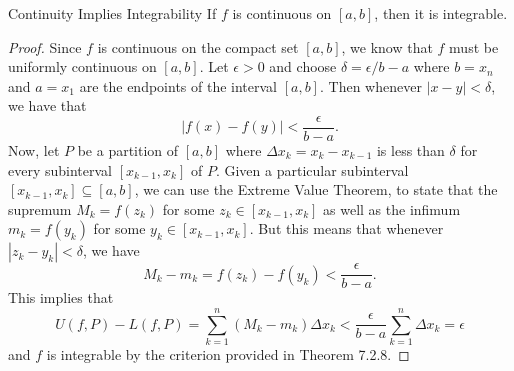 \begin{theorem}{Continuity Implies Integrability}{}
	If \( f  \) is continuous on \( [a,b] \), then it is integrable.
\end{theorem}

\begin{proof}
	Since \( f  \) is continuous on the compact set \( [a,b]  \), we know that \( f  \) must be uniformly continuous on \( [a,b]  \). Let \( \epsilon > 0  \) and choose \( \delta = \epsilon / b -a  \) where \( b = x_{n}   \) and \( a = x_{1}  \) are the endpoints of the interval \( [a,b ] \). Then whenever \( | x - y  | < \delta  \), we have that 
	\[  | f(x) - f(y)  | < \frac{ \epsilon  }{  b - a  }. \]
	Now, let \( P  \) be a partition of \( [a,b]  \) where \( \Delta x_{ k } = x_{ k } - x _{ k -1 } \) is less than \( \delta  \) for every subinterval \( [x_{k-1 } , x_{k }] \) of \( P  \). Given a particular subinterval \( [x_{k-1}, x_{ k } ] \subseteq [a,b]   \), we can use the Extreme Value Theorem, to state that the supremum \(  M_{k} = f(z_{k })  \) for some \( z_{k } \in [x_{ k-1 } , x_{k}]  \) as well as the infimum \( m_{k } = f(y_{k }) \) for some \( y_{ k } \in [x_{k -1 } , x_{ k }]  \). But this means that whenever \( | z_{k } - y_{k } | < \delta  \), we have 
	\[  M_{k } - m_{k } = f(z_{k}) - f(y_{k } ) < \frac{ \epsilon  }{  b -a  }. \]
	This implies that 
	\[  U(f, P ) - L(f,P ) = \sum_{ k=1 }^{ n } (M_{k } - m_{ k } ) \Delta x_{k} < \frac{ \epsilon  }{ b -a  }  \sum_{ k=1 }^{ n } \Delta x_{k} = \epsilon \]
	and \( f  \) is integrable by the criterion provided in Theorem 7.2.8.
\end{proof}



